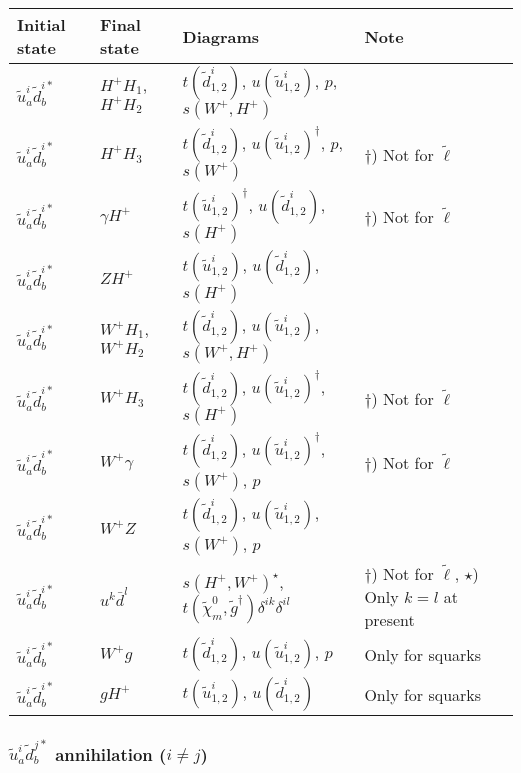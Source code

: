 \begin{center}
\begin{tabular}{llll} \hline
{\bfseries Initial state} & {\bfseries Final state} &
{\bfseries Diagrams} & {\bfseries Note} \\ \hline \tabspace
$\tilde{u}^i_a \tilde{d}^{i*}_b$ & $H^+ H_1$, $H^+ H_2$ &
$t(\tilde{d}^i_{1,2})$, $u(\tilde{u}^i_{1,2})$, $p$, $s(W^+,H^+)$  \\
$\tilde{u}^i_a \tilde{d}^{i*}_b$ & $H^+ H_3$ &
$t(\tilde{d}^i_{1,2})$, $u(\tilde{u}^i_{1,2})^\dagger$, $p$, $s(W^+)$ 
& $\dagger$) Not for $\tilde{\ell}$ \\
$\tilde{u}^i_a \tilde{d}^{i*}_b$ & $\gamma H^+$ &
$t(\tilde{u}^i_{1,2})^\dagger$, $u(\tilde{d}^i_{1,2})$, $s(H^+)$ 
& $\dagger$) Not for $\tilde{\ell}$ \\
$\tilde{u}^i_a \tilde{d}^{i*}_b$ & $Z H^+$ &
$t(\tilde{u}^i_{1,2})$, $u(\tilde{d}^i_{1,2})$, $s(H^+)$ \\
$\tilde{u}^i_a \tilde{d}^{i*}_b$ & $W^+ H_1$, $W^+ H_2$  &
$t(\tilde{d}^i_{1,2})$, $u(\tilde{u}^i_{1,2})$, $s(W^+,H^+)$ \\
$\tilde{u}^i_a \tilde{d}^{i*}_b$ & $W^+ H_3$  &
$t(\tilde{d}^i_{1,2})$, $u(\tilde{u}^i_{1,2})^\dagger$, $s(H^+)$ 
& $\dagger$) Not for $\tilde{\ell}$ \\
$\tilde{u}^i_a \tilde{d}^{i*}_b$ & $W^+ \gamma$  &
$t(\tilde{d}^i_{1,2})$, $u(\tilde{u}^i_{1,2})^\dagger$, $s(W^+)$, $p$ 
& $\dagger$) Not for $\tilde{\ell}$ \\
$\tilde{u}^i_a \tilde{d}^{i*}_b$ & $W^+ Z$  &
$t(\tilde{d}^i_{1,2})$, $u(\tilde{u}^i_{1,2})$, $s(W^+)$, $p$ \\
$\tilde{u}^i_a \tilde{d}^{i*}_b$ & $u^k \bar{d}^l$ &
$s(H^+,W^+)^\star$, $t(\tilde{\chi}_m^0,\tilde{g}^\dagger)\delta^{ik}\delta^{il}$ 
& \parbox[t]{4cm}{$\dagger$) Not for $\tilde{\ell}$, $\star$) Only $k=l$ at present} \\ 
$\tilde{u}^i_a \tilde{d}^{i*}_b$ & $W^+ g$ &
$t(\tilde{d}^i_{1,2})$, $u(\tilde{u}^i_{1,2})$, $p$
& Only for squarks \\ 
$\tilde{u}^i_a \tilde{d}^{i*}_b$ & $g H^+$ &
$t(\tilde{u}^i_{1,2})$, $u(\tilde{d}^i_{1,2})$
& Only for squarks \\ \hline
\end{tabular}
\end{center}

\subsubsection{$\tilde{u}_a^i \tilde{d}_{b}^{j*}$ annihilation ($i \ne j$)}

